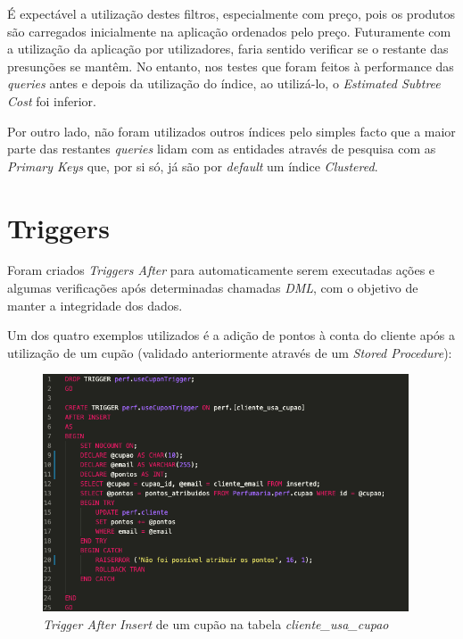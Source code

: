\documentclass[10pt,portuguese]{article}
\begin{document}
\par É expectável a utilização destes filtros, especialmente com preço, pois os produtos são carregados inicialmente na aplicação ordenados pelo preço. Futuramente com a utilização da aplicação por utilizadores, faria sentido verificar se o restante das presunções se mantêm. No entanto, nos testes que foram feitos à performance das \textit{queries} antes e depois da utilização do índice, ao utilizá-lo, o \textit{Estimated Subtree Cost} foi inferior.

\par Por outro lado, não foram utilizados outros índices pelo simples facto que a maior parte das restantes \textit{queries} lidam com as entidades através de pesquisa com as \textit{Primary Keys} que, por si só, já são por \textit{default} um índice \textit{Clustered}.

\clearpage

\section{Triggers}

\par Foram criados \textit{Triggers After} para automaticamente serem executadas ações e algumas verificações após determinadas chamadas \textit{DML}, com o objetivo de manter a integridade dos dados.

\par Um dos quatro exemplos utilizados é a adição de pontos à conta do cliente após a utilização de um cupão (validado anteriormente através de um \textit{Stored Procedure}):

\begin{figure}[!h]
    \centering
    \includegraphics[width=410]{images/useCuponTrigger.png}
    \caption{\textit{Trigger After Insert} de um cupão na tabela \textit{cliente\_usa\_cupao}}
\end{figure}
\end{document}
